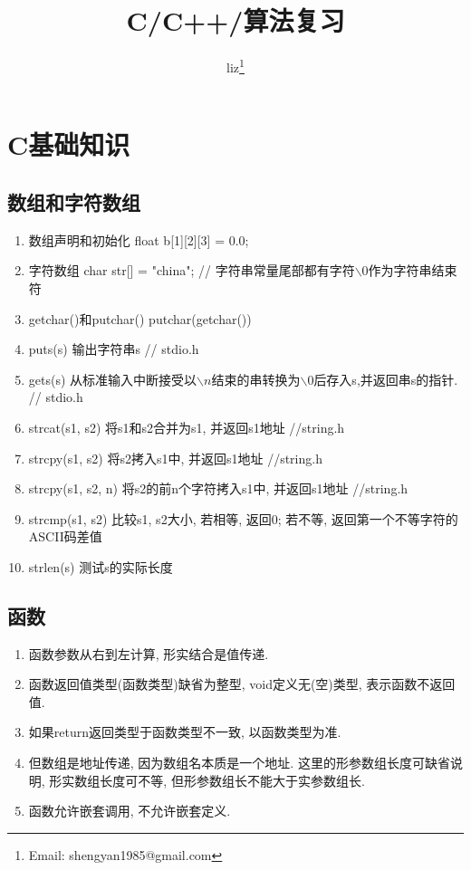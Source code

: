 \documentclass[a4paper,10pt,english]{article}
\title{C/C++/算法复习}
\author{liz\footnote{Email: shengyan1985@gmail.com}}
\begin{document}
\maketitle
\tableofcontents
\clearpage

\section{C基础知识}
\subsection{数组和字符数组}
\begin{enumerate}
\item {数组声明和初始化}
float b[1][2][3] = {0.0};

\item {字符数组}
char str[] = "china"; // 字符串常量尾部都有字符$\backslash 0$作为字符串结束符 

\item {getchar()和putchar()} 
putchar(getchar())

\item {puts(s)}
输出字符串s  // stdio.h

\item {gets(s)}
从标准输入中断接受以$\backslash n$结束的串转换为$\backslash 0$后存入s,并返回串s的指针.  // stdio.h

\item {strcat(s1, s2)}
将s1和s2合并为s1, 并返回s1地址 //string.h

\item {strcpy(s1, s2)}
将s2拷入s1中, 并返回s1地址 //string.h

\item {strcpy(s1, s2, n)}
将s2的前n个字符拷入s1中, 并返回s1地址 //string.h

\item {strcmp(s1, s2)}
比较s1, s2大小, 若相等, 返回0; 若不等, 返回第一个不等字符的ASCII码差值

\item {strlen(s)}
测试s的实际长度

\end{enumerate}

\subsection {函数}
\begin{enumerate}
\item {}
函数参数从右到左计算, 形实结合是值传递.
\item{}
函数返回值类型(函数类型)缺省为整型, void定义无(空)类型, 表示函数不返回值.
\item {}
如果return返回类型于函数类型不一致, 以函数类型为准.
\item{}
但数组是地址传递, 因为数组名本质是一个地址. 这里的形参数组长度可缺省说明, 形实数组长度可不等, 但形参数组长不能大于实参数组长.
\item {}
函数允许嵌套调用, 不允许嵌套定义.
\end{enumerate}
\end{document}
